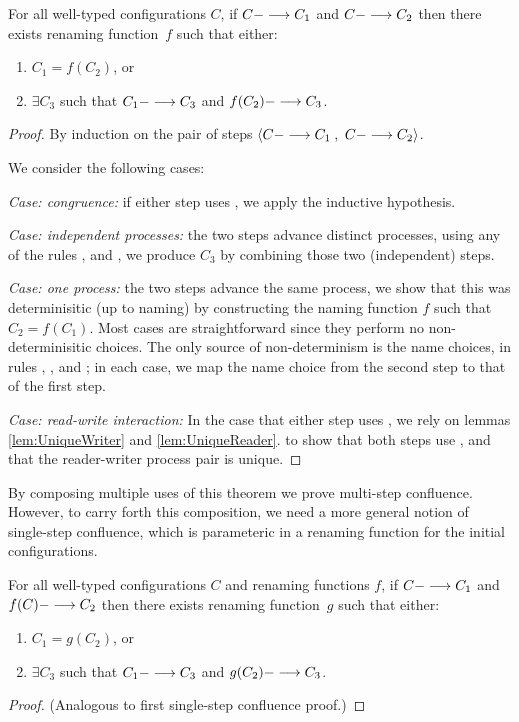 \begin{theorem}
For all well-typed configurations $C$,
%
 if $C ---> C_1$ 
and $C ---> C_2$ 
then 
there exists renaming function~$f$ 
such that either:
\begin{enumerate}
\item %
$C_1 = f(C_2)$,
or
\item $\exists C_3$ such that $C_1 ---> C_3$ and $f(C_2) ---> C_3$.
\end{enumerate}
\begin{proof}
   By induction on the pair of steps 
   $\left< C ---> C_1\right.$, 
   $\left.C ---> C_2 \right>$.

   We consider the following cases:

   \emph{Case: congruence:} if either step uses , we apply the inductive hypothesis.
   
   \emph{Case: independent processes:} 
     the two steps advance distinct processes, using any of the rules ,  and ,
     we produce $C_3$ by combining those two (independent) steps.     

   \emph{Case: one process:}    
   the two steps advance the same process, we show that this was
   determinisitic (up to naming) by constructing the naming function
   $f$ such that $C_2 = f(C_1)$.  Most cases are straightforward since
   they perform no non-determinisitic choices.  The only source of
   non-determinism is the name choices, in rules ,
   , and ; in each case, we map the name choice
   from the second step to that of the first step.

   \emph{Case: read-write interaction:}
   In the case that either step uses , 
   we rely on
   lemmas \ref{lem:UniqueWriter} and \ref{lem:UniqueReader}.
   to show that both steps use ,
   and that the reader-writer process pair is unique.
   
\end{proof}
\end{theorem}

By composing multiple uses of this theorem
we prove multi-step confluence.
However, to carry forth this composition, we need a more general
notion of single-step confluence, which is parameteric in a renaming
function for the initial configurations.

\begin{theorem}
For all well-typed configurations $C$ 
and renaming functions $f$,
%
 if $C ---> C_1$ 
and $f(C) ---> C_2$ 
then 
there exists renaming function~$g$ 
such that either:
\begin{enumerate}
\item %
$C_1 = g(C_2)$,
or
\item $\exists C_3$ such that $C_1 ---> C_3$ and $g(C_2) ---> C_3$.
\end{enumerate}
\begin{proof}
  (Analogous to first single-step confluence proof.)
\end{proof}
\end{theorem}

